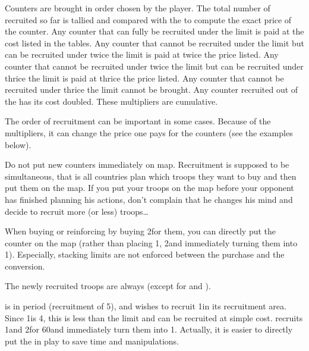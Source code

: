 \aparag[Multipliers.] Counters are brought in order chosen by the player. The
total number of \LD recruited so far is tallied and compared with the
 to compute the exact price of the counter.
\bparag Any counter that can fully be recruited under the limit is paid at the
cost listed in the tables.
\bparag Any counter that cannot be recruited under the limit but can be
recruited under twice the limit is paid at twice the price listed.
\bparag Any counter that cannot be recruited under twice the limit but can be
recruited under thrice the limit is paid at thrice the price listed.
\bparag Any counter that cannot be recruited under thrice the limit cannot be
brought.
\bparag Any counter recruited out of the  has its cost
doubled.
\bparag These multipliers are cumulative.

\begin{playtip}
  The order of recruitment can be important in some cases. Because of the
  multipliers, it can change the price one pays for the counters (see the
  examples below).

  Do not put new counters immediately on map. Recruitment is supposed to be
  simultaneous, that is all countries plan which troops they want to buy and
  then put them on the map. If you put your troops on the map before your
  opponent has finished planning his actions, don't complain that he changes
  his mind and decide to recruit more (or less) troops\ldots

  When buying \ARMY\Faceplus or reinforcing \ARMY\Facemoins by buying 2\LD for
  them, you can directly put the \ARMY\Faceplus counter on the map (rather
  than placing 1\ARMY\Facemoins, 2\LD and immediately turning them into
  1\ARMY\Faceplus). Especially, stacking limits are not enforced between the
  purchase and the conversion.
\end{playtip}

\aparag[Moral.] The newly recruited troops are always 
(except for \SUE and \PRU).


\begin{exemple}
  \HIS is \TARQ in period  (recruitment of 5\LD), and wishes to
  recruit 1\ARMY\Faceplus in its recruitment area. Since 1\ARMY\Faceplus is
  4\LD, this is less than the limit and can be recruited at simple cost. \HIS
  recruits 1\ARMY\Facemoins and 2\LD for 60\ducats and immediately turn them
  into 1\ARMY\Faceplus. Actually, it is easier to directly put the
  \ARMY\Faceplus in play to save time and manipulations.
\end{exemple}

